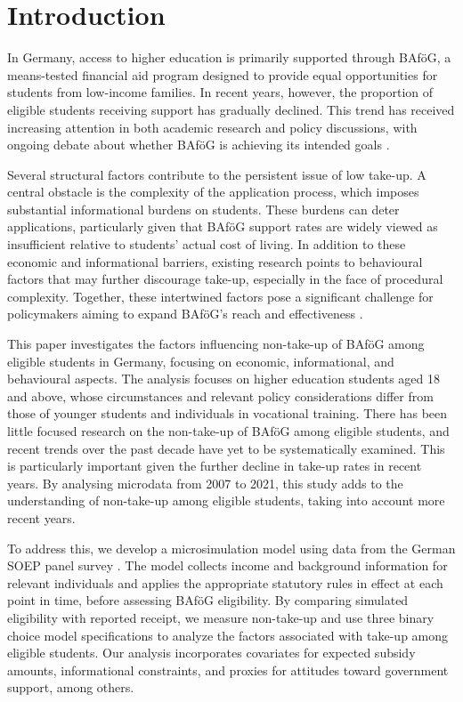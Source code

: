 \section{Introduction}

In Germany, access to higher education is primarily supported through BAföG, a means-tested financial aid program designed to provide equal opportunities for students from low-income families. In recent years, however, the proportion of eligible students receiving support has gradually declined. This trend has received increasing attention in both academic research and policy discussions, with ongoing debate about whether BAföG is achieving its intended goals \citep{gwosc_krisenbewaltigung_2022, meier_bafog_2024}.

Several structural factors contribute to the persistent issue of low take-up. 
A central obstacle is the complexity of the application process, which imposes substantial informational burdens on students. 
These burdens can deter applications, particularly given that BAföG support rates are widely viewed as insufficient relative to students’ actual cost of living. 
In addition to these economic and informational barriers, existing research points to behavioural factors that may further discourage take-up, especially in the face of procedural complexity. 
Together, these intertwined factors pose a significant challenge for policymakers aiming to expand BAföG’s reach and effectiveness \citep{staack_von_2017, bhargava_psychological_2015, bolland_information_nodate}.

This paper investigates the factors influencing non-take-up of BAföG among eligible students in Germany, focusing on economic, informational, and behavioural aspects. 
The analysis focuses on higher education students aged 18 and above, whose circumstances and relevant policy considerations differ from those of younger students and individuals in vocational training.
There has been little focused research on the non-take-up of BAföG among eligible students, and recent trends over the past decade have yet to be systematically examined.
This is particularly important given the further decline in take-up rates in recent years. 
By analysing microdata from 2007 to 2021, this study adds to the understanding of non-take-up among eligible students, taking into account more recent years.


To address this, we develop a microsimulation model using data from the German SOEP panel survey \citep{soepcore_v39}. 
The model collects income and background information for relevant individuals and applies the appropriate statutory rules in effect at each point in time, before assessing BAföG eligibility. 
By comparing simulated eligibility with reported receipt, we measure non-take-up and use three binary choice model specifications to analyze the factors associated with take-up among eligible students. 
Our analysis incorporates covariates for expected subsidy amounts, informational constraints, and proxies for attitudes toward government support, among others. 

